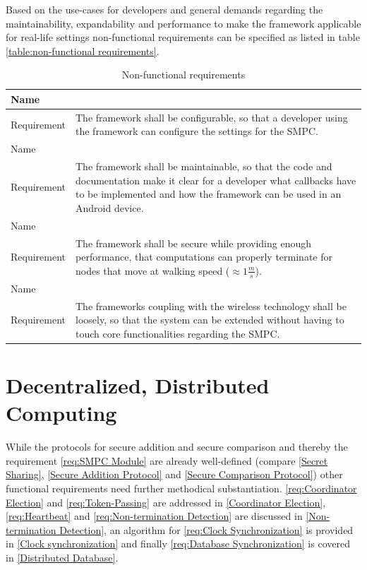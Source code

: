 	Based on the use-cases for developers and general demands regarding the maintainability, expandability and performance to make the framework applicable for real-life settings non-functional requirements can be specified as listed in table \ref{table:non-functional requirements}.

	\begin{table}[!htb] %
		\centering
		\caption{Non-functional requirements}
		\label{table:non-functional requirements}
		\begin{tabular}{|l|p{}|}
			\toprule
		Name & \nonfuncreq{Usability}\label{req:Usability} \\ \midrule
		Requirement & The framework shall be configurable, so that a developer using the framework can configure the settings for the \gls{SMPC}. \\ \midrule
		Name & \nonfuncreq{Maintainability}\label{req:Supportability} \\ \midrule
		Requirement & The framework shall be maintainable, so that the code and documentation make it clear for a developer what callbacks have to be implemented and how the framework can be used in an Android device. \\ \midrule
		Name & \nonfuncreq{Performance}\label{req:Performance} \\ \midrule
		Requirement & The framework shall be secure while providing enough performance, that computations can properly terminate for nodes that move at walking speed ($\approx1\frac{m}{s}$). \\ \midrule
		Name & \nonfuncreq{Expandability}\label{req:Expandability} \\ \midrule
		Requirement & The frameworks coupling with the wireless technology shall be loosely, so that the system can be extended without having to touch core functionalities regarding the \gls{SMPC}.  \\ \bottomrule
		\end{tabular}
	\end{table}
		
	\FloatBarrier
	\section{Decentralized, Distributed Computing}
	\label{Decentralized, Distributed Computing}
	
		While the protocols for secure addition and secure comparison and thereby the requirement \ref{req:SMPC Module} are already well-defined (compare \ref{Secret Sharing}, \ref{Secure Addition Protocol} and \ref{Secure Comparison Protocol}) other functional requirements need further methodical substantiation. \ref{req:Coordinator Election} and \ref{req:Token-Passing} are addressed in \ref{Coordinator Election}, \ref{req:Heartbeat} and \ref{req:Non-termination Detection} are discussed in \ref{Non-termination Detection}, an algorithm for \ref{req:Clock Synchronization} is provided in \ref{Clock synchronization} and finally \ref{req:Database Synchronization} is covered in \ref{Distributed Database}.

